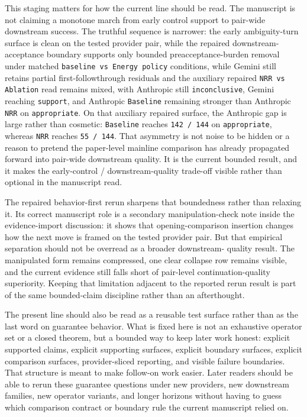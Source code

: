 \documentclass[11pt]{article}
\begin{document}
This staging matters for how the current line should be read. The manuscript is
not claiming a monotone march from early control support to pair-wide
downstream success. The truthful sequence is narrower: the early ambiguity-turn
surface is clean on the tested provider pair, while the repaired downstream-
acceptance boundary supports only bounded preacceptance-burden removal under
matched \texttt{baseline vs Energy policy} conditions, while Gemini still
retains partial first-followthrough residuals and the auxiliary repaired
\texttt{NRR vs Ablation} read remains mixed, with Anthropic still
\texttt{inconclusive}, Gemini reaching \texttt{support}, and Anthropic
\texttt{Baseline} remaining stronger than Anthropic \texttt{NRR} on
\texttt{appropriate}. On that auxiliary repaired surface, the Anthropic gap is
large rather than cosmetic: \texttt{Baseline} reaches \texttt{142 / 144} on
\texttt{appropriate}, whereas \texttt{NRR} reaches \texttt{55 / 144}. That
asymmetry is not noise to be hidden or a reason to
pretend the paper-level mainline comparison has already propagated forward into
pair-wide downstream quality. It is the current bounded result, and it makes
the early-control / downstream-quality trade-off visible rather than optional in
the manuscript read.

The repaired behavior-first rerun sharpens that boundedness rather than
relaxing it. Its correct manuscript role is a secondary manipulation-check note
inside the evidence-import discussion: it shows that opening-comparison
insertion changes how the next move is framed on the tested provider pair. But
that empirical separation should not be overread as a broader downstream-
quality result. The manipulated form remains compressed, one clear collapse row
remains visible, and the current evidence still falls short of pair-level
continuation-quality superiority. Keeping that limitation adjacent to the
reported rerun result is part of the same bounded-claim discipline rather than
an afterthought.

The present line should also be read as a reusable test surface rather than as
the last word on guarantee behavior. What is fixed here is not an exhaustive
operator set or a closed theorem, but a bounded way to keep later work honest:
explicit supported claims, explicit supporting surfaces, explicit boundary
surfaces, explicit comparison surfaces, provider-sliced reporting, and visible
failure boundaries. That
structure is meant to make follow-on work easier. Later readers should be able
to rerun these guarantee questions under new providers, new downstream
families, new operator variants, and longer horizons without having to guess
which comparison contract or boundary rule the current manuscript relied on.
\end{document}
